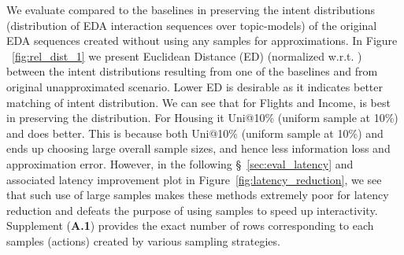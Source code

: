 We evaluate \name compared to the baselines in preserving the intent distributions (distribution of EDA interaction sequences over topic-models) of the original EDA sequences created without using any samples for approximations. 
%
In Figure ~\ref{fig:rel_dist_1} we present Euclidean Distance (ED) (normalized w.r.t. \name) between the intent distributions resulting from one of the baselines and from original unapproximated scenario. 
Lower ED is desirable as it indicates better matching of intent distribution. 
We can see that for Flights and Income, \name is best in preserving the distribution. 
For Housing it {Uni@10\%} (uniform sample at 10\%) and \greedy does better. 
This is because both {Uni@10\%} (uniform sample at 10\%) and \greedy ends up choosing large overall sample sizes, and hence less information loss and approximation error.  
However, in the following \S~\ref{sec:eval_latency} and associated latency improvement plot in Figure~\ref{fig:latency_reduction}, we see that such use of large samples makes these methods extremely poor for latency reduction and defeats the purpose of using samples to speed up interactivity. 
Supplement (\textbf{A.1}) provides the exact number of rows corresponding to each samples (actions) created by various sampling strategies.
%
%
%
%

